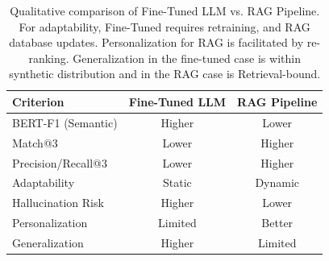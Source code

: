 \documentclass[pdflatex,sn-mathphys-num]{sn-jnl}%
\theoremstyle{thmstyleone}%
\theoremstyle{thmstyletwo}%
\theoremstyle{thmstylethree}%
\begin{document}
\begin{table}[htbp]
    \centering

    \renewcommand{\arraystretch}{1.2} %
    \begin{tabular}{@{}lcc@{}}
    \toprule
    \textbf{Criterion} & \textbf{Fine-Tuned LLM} & \textbf{RAG Pipeline} \\
    \midrule
    BERT-F1 (Semantic)     & Higher          & Lower \\
    Match@3                & Lower           & Higher \\
    Precision/Recall@3     & Lower           & Higher \\
    Adaptability           & Static & Dynamic \\
    Hallucination Risk     & Higher          & Lower \\
    Personalization        & Limited         & Better \\
    Generalization         & Higher & Limited \\
    \bottomrule
    \end{tabular}
        \caption{Qualitative comparison of Fine-Tuned LLM vs. RAG Pipeline. For adaptability, Fine-Tuned requires retraining, and RAG database updates. Personalization for RAG is facilitated by re-ranking. Generalization in the fine-tuned case is within synthetic distribution and in the RAG case is Retrieval-bound.}
    \label{tab:comparison}
\end{table}
\end{document}
